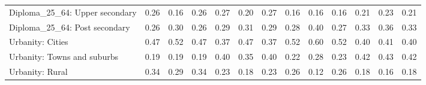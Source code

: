 \begin{tabular}[t]{lllllllllllll}
Diploma\_25\_64: Upper secondary & 0.26 & 0.16 & 0.26 & 0.27 & 0.20 & 0.27 & 0.16 & 0.16 & 0.16 & 0.21 & 0.23 & 0.21\\
Diploma\_25\_64: Post secondary & 0.26 & 0.30 & 0.26 & 0.29 & 0.31 & 0.29 & 0.28 & 0.40 & 0.27 & 0.33 & 0.36 & 0.33\\
\addlinespace
Urbanity: Cities & 0.47 & 0.52 & 0.47 & 0.37 & 0.47 & 0.37 & 0.52 & 0.60 & 0.52 & 0.40 & 0.41 & 0.40\\
Urbanity: Towns and suburbs & 0.19 & 0.19 & 0.19 & 0.40 & 0.35 & 0.40 & 0.22 & 0.28 & 0.23 & 0.42 & 0.43 & 0.42\\
Urbanity: Rural & 0.34 & 0.29 & 0.34 & 0.23 & 0.18 & 0.23 & 0.26 & 0.12 & 0.26 & 0.18 & 0.16 & 0.18\\
\bottomrule
\end{tabular}